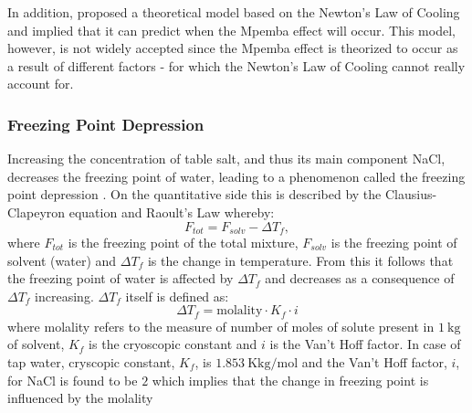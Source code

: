 \documentclass[../main.tex]{subfiles}
\begin{document}
In addition, \textcite{pankovic_mpemba_2012} proposed a theoretical model based on the Newton's Law of Cooling and implied that it can predict when the Mpemba effect will occur. This model, however, is not widely accepted since the Mpemba effect is theorized to occur as a result of different factors - for which the Newton's Law of Cooling cannot really account for. \par   

\subsubsection{Freezing Point Depression}

Increasing the concentration of table salt, and thus its main component NaCl, decreases the freezing point of water, leading to a phenomenon called the freezing point depression \autocite{helmenstine_heres_nodate}. On the quantitative side this is described by the Clausius-Clapeyron equation and Raoult's Law whereby:
\begin{equation} \label{eq:freezingPoint}
    F_{tot} = F_{solv} - \Delta T_f,
\end{equation}
where $F_{tot}$ is the freezing point of the total mixture, $F_{solv}$ is the freezing point of solvent (water) and $\Delta T_f$ is the change in temperature. From this it follows that the freezing point of water is affected by $\Delta T_f$ and decreases as a consequence of $\Delta T_f$ increasing. $\Delta T_f$ itself is defined as:
\begin{equation}
    \Delta T_f = \text{molality} \cdot K_f \cdot i 
\end{equation}
where molality refers to the measure of number of moles of solute present in $\SI{1}{\kilogram}$ of solvent, $K_f$ is the cryoscopic constant and $i$ is the Van't Hoff factor. In case of tap water, cryscopic constant, $K_f$, is $\SI{1.853}{\kelvin\kilo\gram\per\mole}$ and the Van't Hoff factor, $i$, for NaCl is found to be $2$ \autocite{noauthor_vant_nodate} which implies that the change in freezing point is influenced by the molality \par 
\end{document}
